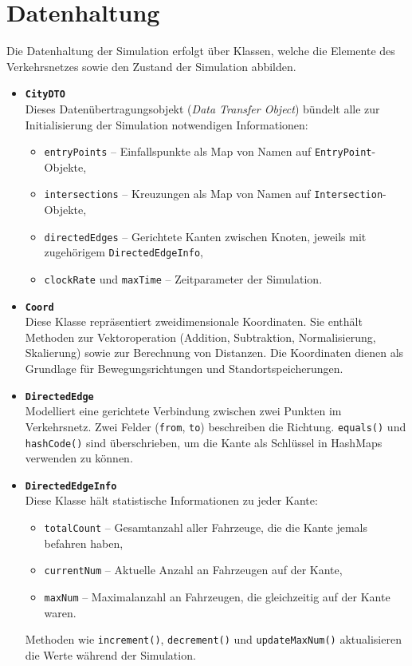 \section{Datenhaltung}


Die Datenhaltung der Simulation erfolgt über Klassen, welche die Elemente des Verkehrsnetzes sowie den Zustand der Simulation abbilden.

\begin{itemize}
  \item \textbf{\texttt{CityDTO}}\\
  Dieses Datenübertragungsobjekt (\emph{Data Transfer Object}) bündelt alle zur Initialisierung der Simulation notwendigen Informationen:
  \begin{itemize}
    \item \texttt{entryPoints} -- Einfallspunkte als Map von Namen auf \texttt{EntryPoint}-Objekte,
    \item \texttt{intersections} -- Kreuzungen als Map von Namen auf \texttt{Intersection}-Objekte,
    \item \texttt{directedEdges} -- Gerichtete Kanten zwischen Knoten, jeweils mit zugehörigem \texttt{DirectedEdgeInfo},
    \item \texttt{clockRate} und \texttt{maxTime} -- Zeitparameter der Simulation.
  \end{itemize}

  \item \textbf{\texttt{Coord}}\\
  Diese Klasse repräsentiert zweidimensionale Koordinaten.
  Sie enthält Methoden zur Vektoroperation (Addition, Subtraktion, Normalisierung, Skalierung) sowie zur Berechnung von Distanzen.
  Die Koordinaten dienen als Grundlage für Bewegungsrichtungen und Standortspeicherungen.

  \item \textbf{\texttt{DirectedEdge}}\\
  Modelliert eine gerichtete Verbindung zwischen zwei Punkten im Verkehrsnetz.
  Zwei Felder (\texttt{from}, \texttt{to}) beschreiben die Richtung. \texttt{equals()} und \texttt{hashCode()} sind überschrieben, um die Kante als Schlüssel in HashMaps verwenden zu können.

  \item \textbf{\texttt{DirectedEdgeInfo}}\\
  Diese Klasse hält statistische Informationen zu jeder Kante:
  \begin{itemize}
    \item \texttt{totalCount} -- Gesamtanzahl aller Fahrzeuge, die die Kante jemals befahren haben,
    \item \texttt{currentNum} -- Aktuelle Anzahl an Fahrzeugen auf der Kante,
    \item \texttt{maxNum} -- Maximalanzahl an Fahrzeugen, die gleichzeitig auf der Kante waren.
  \end{itemize}
  Methoden wie \texttt{increment()}, \texttt{decrement()} und \texttt{updateMaxNum()} aktualisieren die Werte während der Simulation.


\end{itemize}
